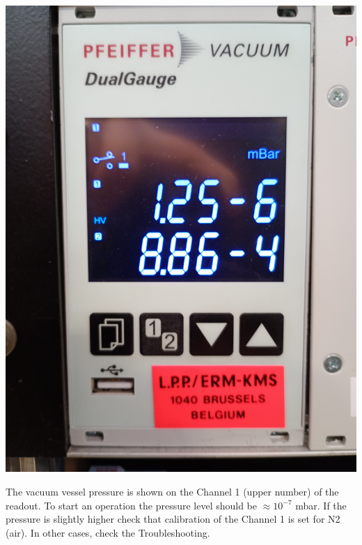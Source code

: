 \documentclass[fleqn,a4paper,20pt]{article}
\begin{document}
\begin{minipage}{.3\textwidth}
	\centering
	\includegraphics[width=\linewidth]{Pressure1}
\end{minipage}
\begin{minipage}{.02\textwidth}
\end{minipage}
\begin{minipage}{.68\textwidth}
	The vacuum vessel pressure is shown on the Channel 1 (upper number) of the readout. To start an operation the pressure level should be $\approx10^{-7}$ mbar. If the pressure is slightly higher check that calibration of the Channel 1 is set for N2 (air). In other cases, check the Troubleshooting.\\
\end{minipage}
\vspace{0.5cm}
\end{document}

